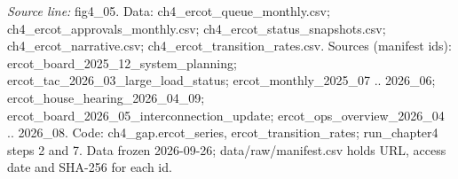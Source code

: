 {\scriptsize\textit{Source line:} fig4\_\allowbreak{}05. Data: ch4\_\allowbreak{}ercot\_\allowbreak{}queue\_\allowbreak{}monthly.csv; ch4\_\allowbreak{}ercot\_\allowbreak{}approvals\_\allowbreak{}monthly.csv; ch4\_\allowbreak{}ercot\_\allowbreak{}status\_\allowbreak{}snapshots.csv; ch4\_\allowbreak{}ercot\_\allowbreak{}narrative.csv; ch4\_\allowbreak{}ercot\_\allowbreak{}transition\_\allowbreak{}rates.csv. Sources (manifest ids): ercot\_\allowbreak{}board\_\allowbreak{}2025\_\allowbreak{}12\_\allowbreak{}system\_\allowbreak{}planning; ercot\_\allowbreak{}tac\_\allowbreak{}2026\_\allowbreak{}03\_\allowbreak{}large\_\allowbreak{}load\_\allowbreak{}status; ercot\_\allowbreak{}monthly\_\allowbreak{}2025\_\allowbreak{}07 .. 2026\_\allowbreak{}06; ercot\_\allowbreak{}house\_\allowbreak{}hearing\_\allowbreak{}2026\_\allowbreak{}04\_\allowbreak{}09; ercot\_\allowbreak{}board\_\allowbreak{}2026\_\allowbreak{}05\_\allowbreak{}interconnection\_\allowbreak{}update; ercot\_\allowbreak{}ops\_\allowbreak{}overview\_\allowbreak{}2026\_\allowbreak{}04 .. 2026\_\allowbreak{}08. Code: ch4\_\allowbreak{}gap.ercot\_\allowbreak{}series, ercot\_\allowbreak{}transition\_\allowbreak{}rates; run\_\allowbreak{}chapter4 steps 2 and 7. Data frozen 2026-09-26; data/raw/manifest.csv holds URL, access date and SHA-256 for each id.}